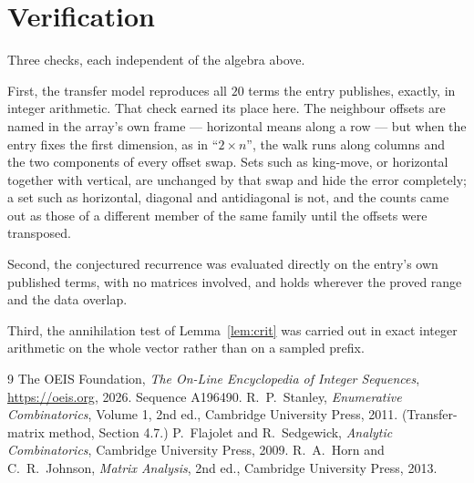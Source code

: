 \documentclass[11pt,a4paper]{article}
\theoremstyle{plain}
\theoremstyle{definition}
\begin{document}
\section{Verification}

Three checks, each independent of the algebra above.

First, the transfer model reproduces all $20$ terms the entry publishes, exactly, in
integer arithmetic. That check earned its place here. The neighbour offsets are named in the
array's own frame --- horizontal means along a row --- but when the entry fixes the first
dimension, as in ``$2\times n$'', the walk runs along columns and the two components of every
offset swap. Sets such as king-move, or horizontal together with vertical, are unchanged by
that swap and hide the error completely; a set such as horizontal, diagonal and antidiagonal
is not, and the counts came out as those of a different member of the same family until the
offsets were transposed.

Second, the conjectured recurrence was evaluated directly on the entry's own published terms,
with no matrices involved, and holds wherever the proved range and the data overlap.

Third, the annihilation test of Lemma~\ref{lem:crit} was carried out in exact integer
arithmetic on the whole vector rather than on a sampled prefix.

\begin{thebibliography}{9}
 The OEIS Foundation, \emph{The On-Line Encyclopedia of Integer
Sequences}, \url{https://oeis.org}, 2026. Sequence A196490.
 R.~P.~Stanley, \emph{Enumerative Combinatorics}, Volume 1, 2nd ed.,
Cambridge University Press, 2011. (Transfer-matrix method, Section 4.7.)
 P.~Flajolet and R.~Sedgewick, \emph{Analytic Combinatorics}, Cambridge
University Press, 2009.
 R.~A.~Horn and C.~R.~Johnson, \emph{Matrix Analysis}, 2nd ed., Cambridge
University Press, 2013.
\end{thebibliography}
\end{document}
